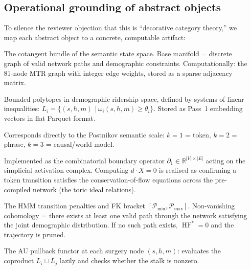 \documentclass[11pt,a4paper]{article}
\DeclareMathOperator{\HF}{HF}
\begin{document}
\subsection{Operational grounding of abstract objects}

To silence the reviewer objection that this is ``decorative
category theory,'' we map each abstract object to a concrete,
computable artifact:

\begin{description}[leftmargin=2cm, style=nextline]
  \item[Symplectic manifold $M$]
    The cotangent bundle of the semantic state space.
    Base manifold = discrete graph of valid network paths and
    demographic constraints.
    Computationally: the 81-node MTR graph with integer edge weights,
    stored as a sparse adjacency matrix.

  \item[Lagrangian submanifolds $L_i$]
    Bounded polytopes in demographic-ridership space, defined by
    systems of linear inequalities:
    $L_i = \{(s,h,m) \mid \omega_i(s,h,m) \geq \theta_i\}$.
    Stored as Pass~1 embedding vectors in flat Parquet format.

  \item[Chain grading $k$]
    Corresponds directly to the Postnikov semantic scale:
    $k=1$ = token, $k=2$ = phrase, $k=3$ = causal/world-model.

  \item[Differential $d$]
    Implemented as the combinatorial boundary operator
    $\partial_1 \in \mathbb{R}^{|V|\times|E|}$ acting on the
    simplicial activation complex.
    Computing $d \cdot X = 0$ is realised as confirming a token
    transition satisfies the conservation-of-flow equations
    across the pre-compiled network (the toric ideal relations).

  \item[Energy functional / $\HF^* \neq 0$]
    The HMM transition penalties and FK bracket
    $[\mathcal{P}_{\min}, \mathcal{P}_{\max}]$.
    Non-vanishing cohomology = there exists at least one valid
    path through the network satisfying the joint demographic
    distribution.
    If no such path exists, $\HF^* = 0$ and the trajectory is pruned.

  \item[Continuation map $\Phi$]
    The AU pullback functor at each surgery node $(s,h,m)$:
    evaluates the coproduct $L_i \sqcup L_j$ lazily and checks
    whether the stalk is nonzero.
\end{description}
\end{document}
